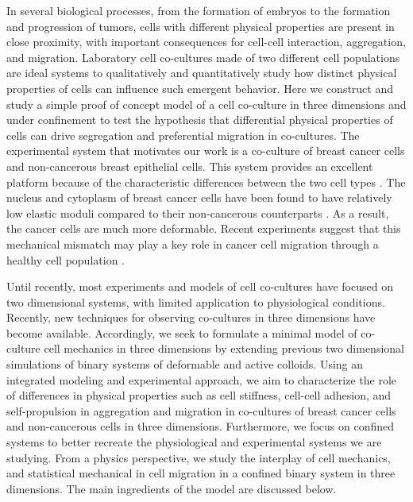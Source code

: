 \documentclass[aps,prb,twocolumn,groupedaddress,nofootinbib,floatfix]{revtex4}
\begin{document}
In several biological processes, from the formation of embryos to the formation and progression of tumors, cells with different physical properties are present in close proximity, with important
consequences for cell-cell interaction, aggregation, and migration. Laboratory cell co-cultures made of two different cell populations are ideal systems to qualitatively and quantitatively 
study how distinct physical properties of cells can influence such emergent behavior. Here we construct and study a simple proof of concept model of a cell co-culture in three dimensions 
and under confinement to test the hypothesis that differential physical properties of cells can drive segregation and preferential migration in co-cultures.   
The experimental system that motivates our work is a co-culture of breast cancer cells and non-cancerous breast epithelial cells. 
This system provides an excellent platform because of the characteristic differences between the two cell types \cite{Lee,Mingming}. 
The nucleus and cytoplasm of breast cancer cells have been found to have relatively low elastic moduli compared to their non-cancerous counterparts \cite{Lee}. 
As a result, the cancer cells are much more deformable. Recent experiments suggest that this mechanical mismatch may play a key role in cancer cell migration through a healthy
cell population \cite{Lee}. 

Until recently, most experiments and models of cell co-cultures have focused on two dimensional systems, with limited application to physiological conditions\cite{Jong}.
Recently, new techniques for observing co-cultures in three dimensions have become available\cite{Alessandri}.  Accordingly, we seek to formulate a minimal
model of co-culture cell mechanics in three dimensions by extending previous two dimensional simulations of binary systems of deformable and active colloids\cite{Butcher}.
Using an integrated modeling and experimental approach, we aim to characterize the role of differences in physical properties such as cell stiffness, cell-cell adhesion,
and self-propulsion in  aggregation and migration in co-cultures of breast cancer cells and non-cancerous cells in three dimensions.
Furthermore, we  focus on confined systems to better recreate the physiological and experimental systems we are studying.
From a physics perspective, we  study the interplay of cell mechanics, and statistical mechanical in cell migration in a confined binary system in three dimensions.
The main ingredients of the model are discussed below.\\
\end{document}
